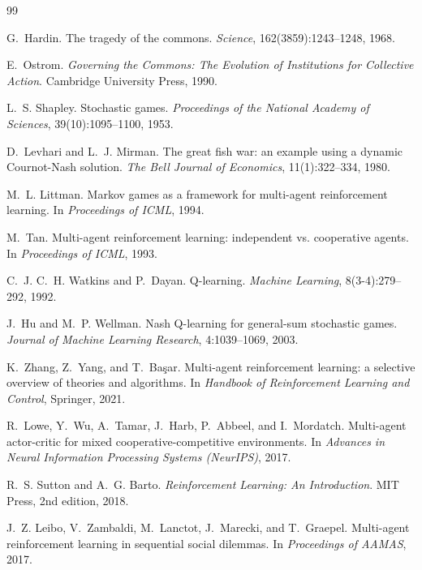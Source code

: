 \documentclass{article}
\begin{document}
{\small
\begin{thebibliography}{99}
\setlength{\itemsep}{0.5pt}

G.~Hardin.
\newblock The tragedy of the commons.
\newblock \textit{Science}, 162(3859):1243--1248, 1968.

E.~Ostrom.
\newblock \textit{Governing the Commons: The Evolution of Institutions for Collective Action}.
\newblock Cambridge University Press, 1990.

L.~S. Shapley.
\newblock Stochastic games.
\newblock \textit{Proceedings of the National Academy of Sciences}, 39(10):1095--1100, 1953.

D.~Levhari and L.~J. Mirman.
\newblock The great fish war: an example using a dynamic Cournot-Nash solution.
\newblock \textit{The Bell Journal of Economics}, 11(1):322--334, 1980.

M.~L. Littman.
\newblock Markov games as a framework for multi-agent reinforcement learning.
\newblock In \textit{Proceedings of ICML}, 1994.

M.~Tan.
\newblock Multi-agent reinforcement learning: independent vs. cooperative agents.
\newblock In \textit{Proceedings of ICML}, 1993.

C.~J. C.~H. Watkins and P.~Dayan.
\newblock Q-learning.
\newblock \textit{Machine Learning}, 8(3-4):279--292, 1992.

J.~Hu and M.~P. Wellman.
\newblock Nash Q-learning for general-sum stochastic games.
\newblock \textit{Journal of Machine Learning Research}, 4:1039--1069, 2003.

K.~Zhang, Z.~Yang, and T.~Ba\c{s}ar.
\newblock Multi-agent reinforcement learning: a selective overview of theories and algorithms.
\newblock In \textit{Handbook of Reinforcement Learning and Control}, Springer, 2021.

R.~Lowe, Y.~Wu, A.~Tamar, J.~Harb, P.~Abbeel, and I.~Mordatch.
\newblock Multi-agent actor-critic for mixed cooperative-competitive environments.
\newblock In \textit{Advances in Neural Information Processing Systems (NeurIPS)}, 2017.

R.~S. Sutton and A.~G. Barto.
\newblock \textit{Reinforcement Learning: An Introduction}.
\newblock MIT Press, 2nd edition, 2018.

J.~Z. Leibo, V.~Zambaldi, M.~Lanctot, J.~Marecki, and T.~Graepel.
\newblock Multi-agent reinforcement learning in sequential social dilemmas.
\newblock In \textit{Proceedings of AAMAS}, 2017.


\end{thebibliography}}
\end{document}
